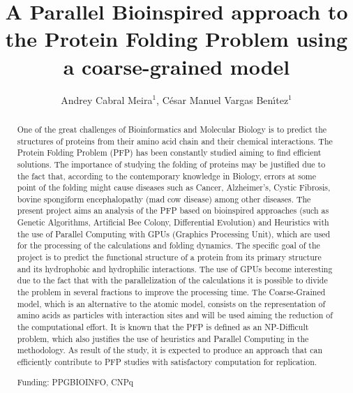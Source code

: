\documentclass[twoside]{article}
\title{\vspace{-15mm}\fontsize{24pt}{10pt}\selectfont\textbf{A Parallel Bioinspired approach to the Protein Folding Problem using a coarse-grained model}} %
\author{Andrey Cabral Meira$^1$, C\'esar Manuel Vargas Ben\'{\i}tez$^1$}
\affil{1 UTFPR\\ }
\date{}
\begin{document}
\maketitle %

\thispagestyle{fancy} %


\begin{abstract}
One of the great challenges of Bioinformatics and Molecular Biology is to predict the structures of proteins from their amino acid chain and their chemical interactions. The Protein Folding Problem (PFP) has been constantly studied aiming to find efficient solutions. The importance of studying the folding of proteins may be justified due to the fact that, according to the contemporary knowledge in Biology, errors at some point of the folding might cause  diseases such as Cancer, Alzheimer's, Cystic Fibrosis, bovine spongiform encephalopathy (mad cow disease) among other diseases. The present project aims an analysis of the PFP based on bioinspired approaches (such as Genetic Algorithms, Artificial Bee Colony, Differential Evolution) and Heuristics with the use of Parallel Computing with GPUs (Graphics Processing Unit), which are used for the processing of the calculations and folding dynamics. The specific goal of the project is to predict the functional structure of a protein from its primary structure and its hydrophobic and hydrophilic interactions. The use of GPUs become interesting due to the fact that with the parallelization of the calculations it is possible to divide the problem in several fractions to improve the processing time. The Coarse-Grained model, which is an alternative to the atomic model, consists on the representation of amino acids as particles with interaction sites and will be used aiming the reduction of the computational effort. It is known that the PFP is defined as an NP-Difficult problem, which also justifies the use of heuristics and Parallel Computing in the methodology. As result of the study, it is expected to produce an approach that can efficiently contribute to PFP studies with satisfactory computation for replication.

Funding: PPGBIOINFO, CNPq
\end{abstract}
\end{document}
